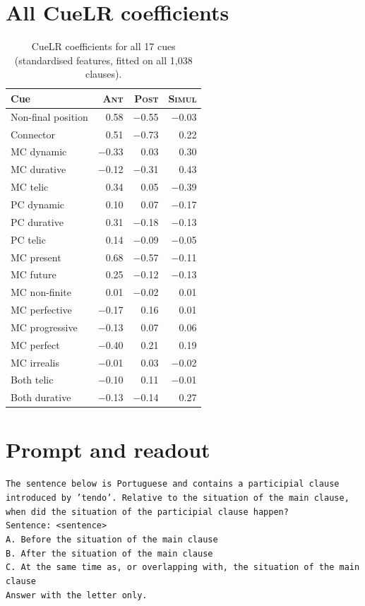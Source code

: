 \documentclass[11pt]{article}
\begin{document}
\section{All CueLR coefficients}
\label{app:coef}
\begin{table}[h]
\centering\small
\setlength{\tabcolsep}{4pt}
\begin{tabular}{lrrr}
\toprule
Cue & \textsc{Ant} & \textsc{Post} & \textsc{Simul} \\
\midrule
Non-final position & 0.58 & $-$0.55 & $-$0.03 \\
Connector & 0.51 & $-$0.73 & 0.22 \\
MC dynamic & $-$0.33 & 0.03 & 0.30 \\
MC durative & $-$0.12 & $-$0.31 & 0.43 \\
MC telic & 0.34 & 0.05 & $-$0.39 \\
PC dynamic & 0.10 & 0.07 & $-$0.17 \\
PC durative & 0.31 & $-$0.18 & $-$0.13 \\
PC telic & 0.14 & $-$0.09 & $-$0.05 \\
MC present & 0.68 & $-$0.57 & $-$0.11 \\
MC future & 0.25 & $-$0.12 & $-$0.13 \\
MC non-finite & 0.01 & $-$0.02 & 0.01 \\
MC perfective & $-$0.17 & 0.16 & 0.01 \\
MC progressive & $-$0.13 & 0.07 & 0.06 \\
MC perfect & $-$0.40 & 0.21 & 0.19 \\
MC irrealis & $-$0.01 & 0.03 & $-$0.02 \\
Both telic & $-$0.10 & 0.11 & $-$0.01 \\
Both durative & $-$0.13 & $-$0.14 & 0.27 \\
\bottomrule
\end{tabular}
\caption{CueLR coefficients for all 17 cues (standardised features, fitted on all 1,038 clauses).}
\end{table}

\section{Prompt and readout}
\label{app:prompts}
\small
\texttt{The sentence below is Portuguese and contains a participial clause introduced by 'tendo'. Relative to the situation of the main clause, when did the situation of the participial clause happen?}\\
\texttt{Sentence: <sentence>}\\
\texttt{A. Before the situation of the main clause}\\
\texttt{B. After the situation of the main clause}\\
\texttt{C. At the same time as, or overlapping with, the situation of the main clause}\\
\texttt{Answer with the letter only.}
\normalsize
\end{document}

